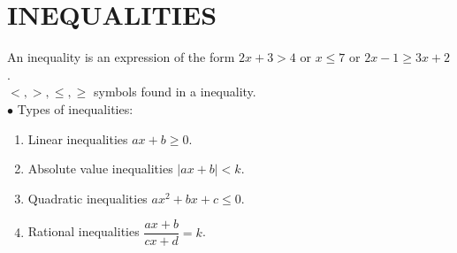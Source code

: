 \documentclass[11pt,a4paper]{article}
\begin{document}
\pagebreak
\section{INEQUALITIES}
An inequality is an expression of the form $2x+3>4$ or $x\leq 7$ or $2x-1\geq 3x+2$.\\

$<,>,\leq ,\geq$ symbols found in a inequality.\\

$\bullet$ Types of inequalities:
\begin{enumerate}
\item Linear inequalities $ax+b\geq 0$.
\item Absolute value inequalities $|ax+b|<k$.
\item Quadratic inequalities $ax^2+bx+c\leq 0$.
\item Rational inequalities $\dfrac{ax+b}{cx+d}=k$.\\
\end{enumerate}
\end{document}

